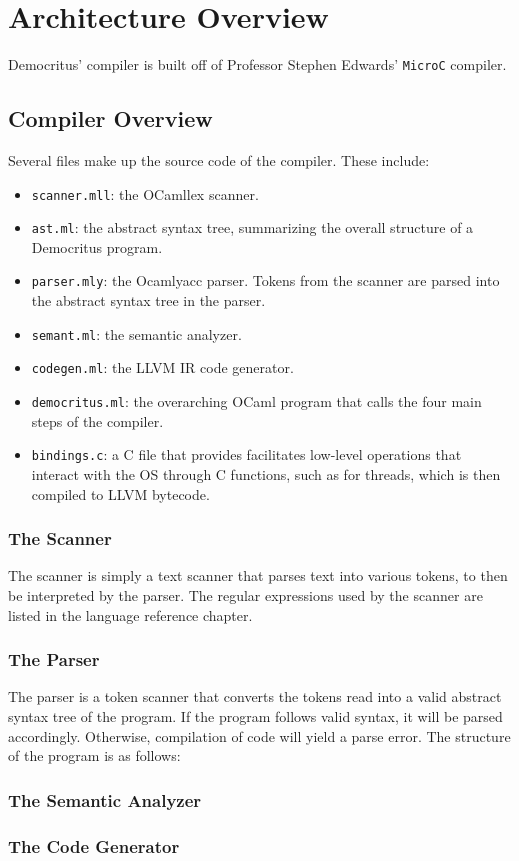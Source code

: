 \chapter{Architecture Overview}
	Democritus' compiler is built off of Professor Stephen Edwards' \texttt{MicroC} compiler. 

\section{Compiler Overview}
  Several files make up the source code of the compiler. These include:
  \begin{itemize}
    \item \texttt{scanner.mll}: the OCamllex scanner.
    \item \texttt{ast.ml}: the abstract syntax tree, summarizing the overall structure of a Democritus program. 
    \item \texttt{parser.mly}: the Ocamlyacc parser. Tokens from the scanner are parsed into the abstract syntax tree in the parser.
    \item \texttt{semant.ml}: the semantic analyzer.
    \item \texttt{codegen.ml}: the LLVM IR code generator.
    \item \texttt{democritus.ml}: the overarching OCaml program that calls the four main steps of the compiler.
    \item \texttt{bindings.c}: a C file that provides facilitates low-level operations that interact with the OS through C functions, such as for threads, which is then compiled to LLVM bytecode.
  \end{itemize}
	\subsection{The Scanner}
    The scanner is simply a text scanner that parses text into various tokens, to then be interpreted by the parser. The regular expressions used by the scanner are listed in the language reference chapter.

	\subsection{The Parser}
    The parser is a token scanner that converts the tokens read into a valid abstract syntax tree of the program. If the program follows valid syntax, it will be parsed accordingly. Otherwise, compilation of code will yield a parse error. The structure of the program is as follows:

	\subsection{The Semantic Analyzer}

	\subsection{The Code Generator}
